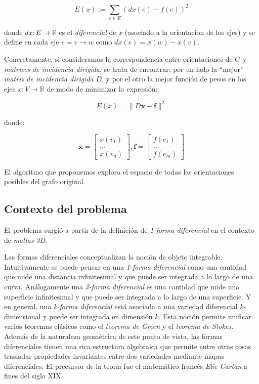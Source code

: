 \documentclass[conference,compsoc,a4paper]{IEEEtran}
\begin{document}
$$E(x) := \sum_{e \in E} (dx(e) - f(e))^2$$

donde $dx: E \rightarrow \mathbb{R}$ es el \textit{diferencial} de $x$ 
(asociado a la orientacion de los ejes) y se define en cada eje 
$e=v\to w$ como $dx(e) = x(w) - x(v)$.

\smallskip

Concretamente, si consideramos la correspondencia entre orientaciones 
de $G$ y \textit{matrices de incidencia dirigida}, se trata de 
encontrar: por un lado la ``mejor" \textit{matriz de incidencia 
dirigida} $D$, y por el otro la mejor función de pesos en los ejes 
$x: V \rightarrow \mathbb{R}$ de modo de minimizar la expresión:

$$E(x) = \|D\bm{x}-\bm{f}\|^2$$

donde:

$$
\bm{x} = 
\begin{bmatrix}
	x(v_1)\\
	\dots \\
	x(v_n)
\end{bmatrix}, 
\bm{f} = 
\begin{bmatrix}
	f(e_1)\\
	\dots \\
	f(e_m)
\end{bmatrix}
$$

El algoritmo que proponemos explora el espacio de todas las 
orientaciones posibles del grafo original.

\subsection{Contexto del problema}
El problema surgió a partir de la definición de \textit{1-forma 
diferencial} en el contexto de \textit{mallas 3D}. 

\bigskip

Las formas diferenciales \cite{S:1965,T:2008} conceptualizan la noción 
de objeto integrable. Intuitivamente se puede pensar en una 
\textit{1-forma diferencial} como una cantidad que mide 
una distancia infinitesimal y que puede ser integrada a lo largo de una 
curva. Análogamente una \textit{2-forma diferencial} es una cantidad 
que mide una superficie infinitesimal y que puede ser integrada a lo 
largo de una superficie. Y en general, una \textit{k-forma diferencial} 
está asociada a una variedad diferencial $k$-dimensional y puede ser 
integrada en dimensión $k$. Esta noción permite unificar varios 
teoremas clásicos como el \textit{teorema de Green} y el \textit{teorema 
de Stokes}. Además de la naturaleza geométrica de este punto de vista, 
las formas diferenciales tienen una rica estructura algebraica que 
permite entre otras cosas trasladar propiedades invariantes entre dos 
variedades mediante mapas diferenciales. El precursor de la 
teoría fue el matemático francés \textit{Elie Cartan} a fines del siglo 
XIX.
\end{document}
